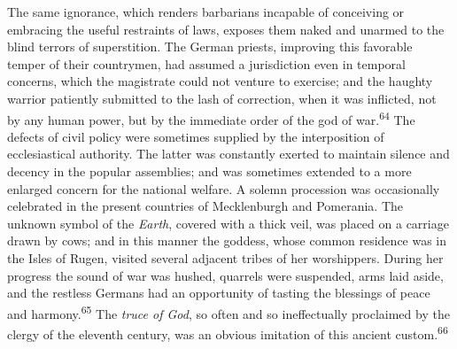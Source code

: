 
The same ignorance, which renders barbarians incapable of
conceiving or embracing the useful restraints of laws, exposes
them naked and unarmed to the blind terrors of superstition. The
German priests, improving this favorable temper of their
countrymen, had assumed a jurisdiction even in temporal concerns,
which the magistrate could not venture to exercise; and the
haughty warrior patiently submitted to the lash of correction,
when it was inflicted, not by any human power, but by the
immediate order of the god of war.\textsuperscript{64} The defects of civil policy
were sometimes supplied by the interposition of ecclesiastical
authority. The latter was constantly exerted to maintain silence
and decency in the popular assemblies; and was sometimes extended
to a more enlarged concern for the national welfare. A solemn
procession was occasionally celebrated in the present countries
of Mecklenburgh and Pomerania. The unknown symbol of the \textit{Earth},
covered with a thick veil, was placed on a carriage drawn by
cows; and in this manner the goddess, whose common residence was
in the Isles of Rugen, visited several adjacent tribes of her
worshippers. During her progress the sound of war was hushed,
quarrels were suspended, arms laid aside, and the restless
Germans had an opportunity of tasting the blessings of peace and
harmony.\textsuperscript{65} The \textit{truce of God}, so often and so ineffectually
proclaimed by the clergy of the eleventh century, was an obvious
imitation of this ancient custom.\textsuperscript{66}





